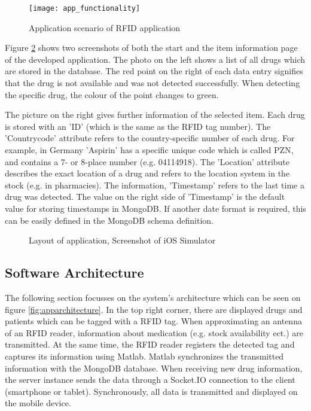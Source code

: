 \begin{figure}
\centering
\texttt{[image: app\_functionality]} 
\caption{\label{fig:appfunctionality}Application scenario of RFID application} 
\end{figure}

Figure \ref{fig:app_screenshot} shows two screenshots of both the start and the item information page of the developed application. The photo on the left shows a list of all drugs which are stored in the database. The red point on the right of each data entry signifies that the drug is not available and was not detected successfully. When detecting the specific drug, the colour of the point changes to green.

The picture on the right gives further information of the selected item. Each drug is stored with an 'ID' (which is the same as the RFID tag number). The 'Countrycode' attribute refers to the country-specific number of each drug. For example, in Germany 'Aspirin' has a specific unique code which is called \ac{PZN}, and contains a 7- or 8-place number (e.g. 04114918). The 'Location' attribute describes the exact location of a drug and refers to the location system in the stock (e.g. in pharmacies). The information, 'Timestamp' refers to the last time a drug was detected. The value on the right side of 'Timestamp' is the default value for storing timestamps in MongoDB. If another date format is required, this can be easily defined in the MongoDB schema definition.

\begin{figure}
\centering
{}
\caption{\label{fig:app_screenshot}Layout of application, Screenshot of iOS Simulator}
\end{figure}

\subsection{Software Architecture} \label{section_architecture}

The following section focusses on the system's architecture which can be seen on figure \ref{fig:apparchitecture}. In the top right corner, there are displayed drugs and patients which can be tagged with a RFID tag. When approximating an antenna of an RFID reader, information about medication (e.g. stock availability ect.) are transmitted. At the same time, the RFID reader registers the detected tag and captures its information using Matlab. Matlab synchronizes the transmitted information with the MongoDB database. When receiving new drug information, the server instance sends the data through a Socket.IO connection to the client (smartphone or tablet). Synchronously, all data is transmitted and displayed on the mobile device.

